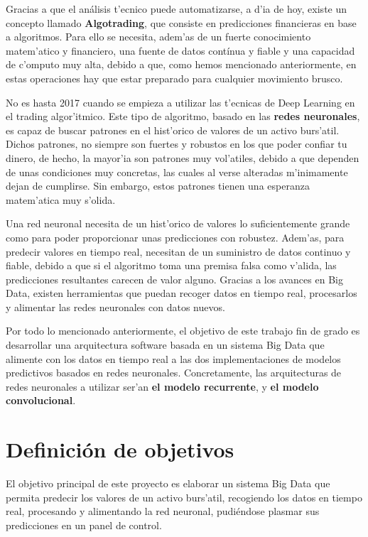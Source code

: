 Gracias a que el análisis t'ecnico puede automatizarse, a d'ia de hoy, existe un concepto llamado \textbf{Algotrading}, que consiste en predicciones financieras en base a algoritmos. Para ello se necesita, adem'as de un fuerte conocimiento matem'atico y financiero, una fuente de datos contínua y fiable y una capacidad de c'omputo muy alta, debido a que, como hemos mencionado anteriormente, en estas operaciones hay que estar preparado para cualquier movimiento brusco.

No es hasta 2017 \cite{introduccion2} cuando se empieza a utilizar las t'ecnicas de Deep Learning en el trading algor'itmico. Este tipo de algoritmo, basado en las \textbf{redes neuronales}, es capaz de buscar patrones en el hist'orico de valores de un activo burs'atil. Dichos patrones, no siempre son fuertes y robustos en los que poder confiar tu dinero, de hecho, la mayor'ia son patrones muy vol'atiles, debido a que dependen de unas condiciones muy concretas, las cuales al verse alteradas m'inimamente dejan de cumplirse. Sin embargo, estos patrones tienen una esperanza matem'atica muy s'olida.

Una red neuronal necesita de un hist'orico de valores lo suficientemente grande como para poder proporcionar unas predicciones con robustez. Adem'as, para predecir valores en tiempo real, necesitan de un suministro de datos continuo y fiable, debido a que si el algoritmo toma una premisa falsa como v'alida, las predicciones resultantes carecen de valor alguno.
Gracias a los avances en Big Data, existen herramientas que puedan recoger datos en tiempo real, procesarlos y alimentar las redes neuronales con datos nuevos. 
 
Por todo lo mencionado anteriormente, el objetivo de este trabajo fin de grado es desarrollar una arquitectura software basada en un sistema Big Data que alimente con los datos en tiempo real a las dos implementaciones de modelos predictivos basados en redes neuronales. Concretamente, las arquitecturas de redes neuronales a utilizar ser'an \textbf{el modelo recurrente}, y \textbf{el modelo convolucional}.


\section{Definici\'on de objetivos}\label{sec:definicion}

El objetivo principal de este proyecto es elaborar un sistema Big Data que permita predecir los valores de un activo burs'atil, recogiendo los datos en tiempo real, procesando y alimentando la red neuronal, pudiéndose plasmar sus predicciones en un panel de control. 

